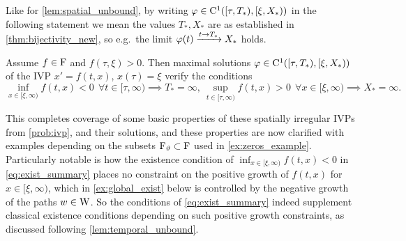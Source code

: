 Like for \autoref{lem:spatial_unbound}, by writing $\varphi\in\mathrm{C}^1([\tau,T_*),[\xi,X_*))$ in the following statement we mean the values $T_*,X_*$ are as established in \autoref{thm:bijectivity_new}, so e.g.~the limit $\varphi(t)\xrightarrow{t\to T_*}X_*$ holds.

\begin{corollary}\label{cor:exist_summary}
    Assume $f\in\mathrm{F}$ and $f(\tau,\xi)>0$. Then maximal solutions $\varphi\in\mathrm{C}^1([\tau,T_*),[\xi,X_*))$ of the IVP $x'\!=\!f(t,x)$, $x(\tau)\!=\!\xi$ verify the conditions~
    \begin{equation}\label{eq:exist_summary}
        \inf_{x\in[\xi,\infty)}f(t,x)<0\ \ \forall t\in[\tau,\infty)\implies T_*=\infty,\ \sup_{t\in[\tau,\infty)}f(t,x)>0\ \ \forall x\in[\xi,\infty)\implies X_*=\infty.
    \end{equation}
\end{corollary}

\vspace{2mm}This completes coverage of some basic properties of these spatially irregular IVPs from \autoref{prob:ivp}, and their solutions, and these properties are now clarified with examples depending on the subsets $\mathrm{F}_\vartheta\subset\mathrm{F}$ used in \autoref{ex:zeros_example}. Particularly notable is how the existence condition of $\inf_{x\in[\xi,\infty)}f(t,x)<0$ in \autoref{eq:exist_summary} places no constraint on the positive growth of $f(t,x)$ for $x\in[\xi,\infty)$, which  in \autoref{ex:global_exist} below is controlled by the negative growth of the paths $w\in\mathrm{W}$. So the conditions of \autoref{eq:exist_summary} indeed supplement classical existence conditions depending on such positive growth constraints, as discussed following \autoref{lem:temporal_unbound}.

